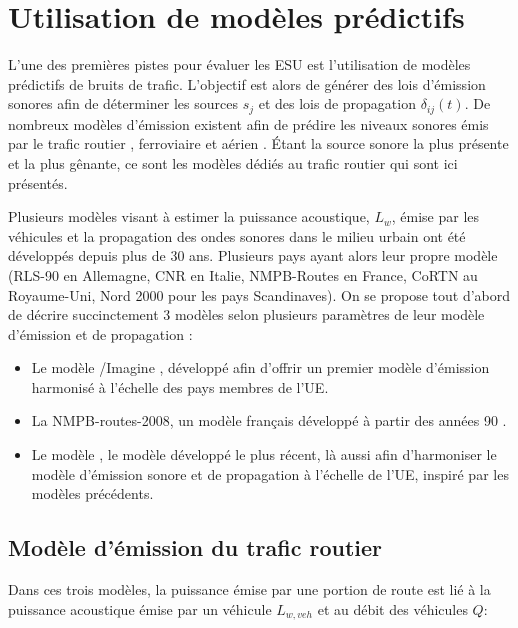 \section{Utilisation de modèles prédictifs}

L'une des premières pistes pour évaluer les ESU est l'utilisation de modèles prédictifs de bruits de trafic. L'objectif est alors de générer des lois d'émission sonores afin de déterminer les sources $s_j$ et des lois de propagation $\delta_{ij}(t)$. De nombreux modèles d'émission existent afin de prédire les niveaux sonores émis par le trafic routier \cite{quartieri2009review}, ferroviaire \cite{van2000railway} et aérien \cite{zaporozhets1998aircraft}. Étant la source sonore la plus présente et la plus gênante, ce sont les modèles dédiés au trafic routier qui sont ici présentés.

Plusieurs modèles visant à estimer la puissance acoustique, $L_w$, émise par les véhicules et la propagation des ondes sonores dans le milieu urbain ont été développés depuis plus de 30 ans. Plusieurs pays ayant alors leur propre modèle (RLS-90 en Allemagne, CNR en Italie, NMPB-Routes en France, CoRTN au Royaume-Uni, Nord 2000 pour les pays Scandinaves). On se propose tout d'abord de décrire succinctement 3 modèles selon plusieurs paramètres de leur modèle d'émission et de propagation : 

\begin{itemize}
\item Le modèle /Imagine \cite{jonasson2004source}, développé afin d'offrir un premier modèle d'émission harmonisé à l'échelle des pays membres de l'UE. 
\item La NMPB-routes-2008, un modèle français développé à partir des années 90 \cite{setra_prevision_2009-1, setra_prevision_2009-2}. 
\item Le modèle   \cite{CNOSSOS}, le modèle développé le plus récent, là aussi afin d'harmoniser le modèle d'émission sonore et de propagation à l'échelle de l'UE, inspiré par les modèles précédents. 
\end{itemize}

\subsection{Modèle d'émission du trafic routier}\label{part:modele_emission}

Dans ces trois modèles, la puissance émise par une portion de route est lié à la puissance acoustique émise par un véhicule $L_{w,veh}$ et au débit des véhicules $Q$: 

